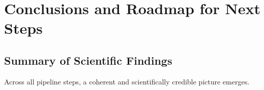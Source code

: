 \documentclass[12pt, a4paper]{article}
\begin{document}

\section{Conclusions and Roadmap for Next Steps}

\subsection{Summary of Scientific Findings}

Across all pipeline steps, a coherent and scientifically credible picture
emerges.
\end{document}
